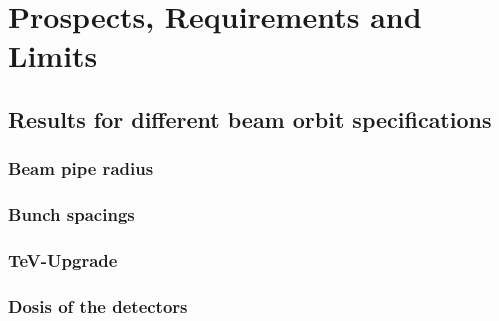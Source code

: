 \chapter{Prospects, Requirements and Limits}
\label{Results}

\section{Results for different beam orbit specifications}
\subsection{Beam pipe radius}
\subsection{Bunch spacings}
\subsection{TeV-Upgrade}
\subsection{Dosis of the detectors}
